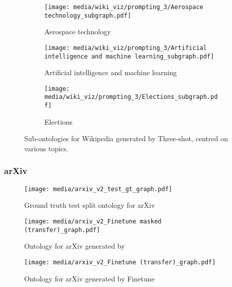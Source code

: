 \begin{figure}[H]
    \centering
    \begin{subfigure}{0.9\textwidth}
    \centering
    \texttt{[image: media/wiki\_viz/prompting\_3/Aerospace technology\_subgraph.pdf]}
    \caption{Aerospace technology}
    \end{subfigure}
    \begin{subfigure}{1.0\textwidth}
    \centering
    \texttt{[image: media/wiki\_viz/prompting\_3/Artificial intelligence and machine learning\_subgraph.pdf]}
    \caption{Artificial intelligence and machine learning}
    \end{subfigure}
    \begin{subfigure}{1.0\textwidth}
    \centering
    \texttt{[image: media/wiki\_viz/prompting\_3/Elections\_subgraph.pdf]}
    \caption{Elections}
    \label{fig:3shot-wiki-samples-election}
    \end{subfigure}
    \caption{Sub-ontologies for Wikipedia generated by Three-shot, centred on various topics.}
\end{figure}

\subsubsection{arXiv}  \label{appendix:viz-arxiv}

\begin{figure}[h]
    \centering
    \texttt{[image: media/arxiv\_v2\_test\_gt\_graph.pdf]}
    \caption{Ground truth test split ontology for arXiv}
\end{figure}


\begin{figure}[h]
    \centering
    \texttt{[image: media/arxiv\_v2\_Finetune masked (transfer)\_graph.pdf]}
    \caption{Ontology for arXiv generated by \name}
    \label{fig:ollm-arxiv}
\end{figure}


\begin{figure}[h]
    \centering
    \texttt{[image: media/arxiv\_v2\_Finetune (transfer)\_graph.pdf]}
    \caption{Ontology for arXiv generated by Finetune}
\end{figure}

